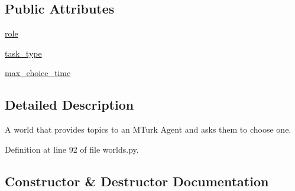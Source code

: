 \subsection*{Public Attributes}
\begin{DoxyCompactItemize}
\item 
\hyperlink{classprojects_1_1wizard__of__wikipedia_1_1mturk__evaluation__task_1_1worlds_1_1TopicChooseWorld_a2eb6c10647cb8207bfa083ef0a493d13}{role}
\item 
\hyperlink{classprojects_1_1wizard__of__wikipedia_1_1mturk__evaluation__task_1_1worlds_1_1TopicChooseWorld_a71ae18a662941ea82999f48817e1c784}{task\+\_\+type}
\item 
\hyperlink{classprojects_1_1wizard__of__wikipedia_1_1mturk__evaluation__task_1_1worlds_1_1TopicChooseWorld_ac951b666993c2d306f11a50d30fe2ed1}{max\+\_\+choice\+\_\+time}
\end{DoxyCompactItemize}


\subsection{Detailed Description}
\begin{DoxyVerb}A world that provides topics to an MTurk Agent and asks them to choose one.
\end{DoxyVerb}
 

Definition at line 92 of file worlds.\+py.



\subsection{Constructor \& Destructor Documentation}
\mbox{\label{classprojects_1_1wizard__of__wikipedia_1_1mturk__evaluation__task_1_1worlds_1_1TopicChooseWorld_a0c6930dd70c72544112407d55c0422ce}} 
